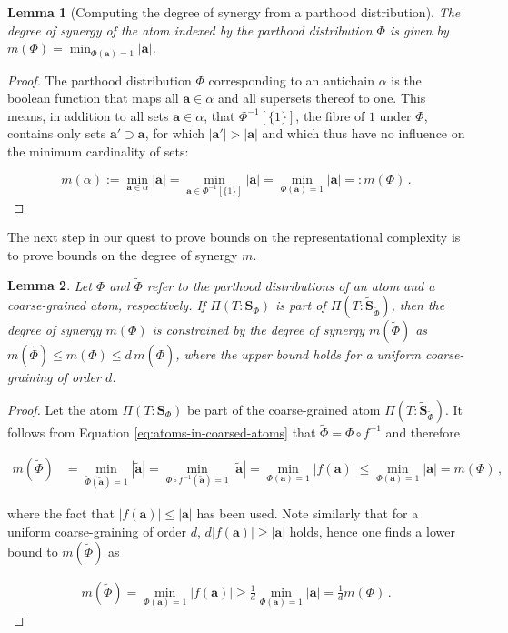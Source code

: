 \documentclass[10pt]{article}
\theoremstyle{definition}
\theoremstyle{plain}
\newtheorem{lemma}{Lemma}[section]
\begin{document}
\begin{lemma}[Computing the degree of synergy from a parthood distribution]
The degree of synergy of the atom indexed by the parthood distribution $\Phi$ is given by $m(\Phi) = \min_{\Phi(\bm{a})=1}|\bm{a}|$.
\end{lemma}
\begin{proof}
The parthood distribution $\Phi$ corresponding to an antichain $\alpha$ is the boolean function that maps all $\bm{a}\in\alpha$ and all supersets thereof to one. This means, in addition to all sets $\bm{a}\in\alpha$, that $\Phi^{-1}[\{1\}]$, the fibre of $1$ under $\Phi$, contains only sets $\bm{a}' \supset \bm{a}$, for which $|\bm{a}'| > |\bm{a}|$ and which thus have no influence on the minimum cardinality of sets:

\begin{equation}
    m(\alpha) := \min_{\bm{a}\in\alpha}|\bm{a}| = \min_{\bm{a}\in\Phi^{-1}[\{1\}]}|\bm{a}| = \min_{\Phi(\bm{a})=1}|\bm{a}| =: m(\Phi)\,.
\end{equation}
\end{proof}

The next step in our quest to prove bounds on the representational complexity is to prove bounds on the degree of synergy $m$.

\begin{lemma}
Let $\Phi$ and $\tilde{\Phi}$ refer to the parthood distributions of an atom and a coarse-grained atom, respectively. If $\Pi(T:\bm{S}_\Phi)$ is part of $\Pi(T:\bm{\tilde{S}}_{\tilde{\Phi}})$, then the degree of synergy $m(\Phi)$ is constrained by the degree of synergy $m(\tilde{\Phi})$ as $m(\tilde{\Phi}) \leq m(\Phi) \leq d\, m(\tilde{\Phi})$, where the upper bound holds for a uniform coarse-graining of order $d$.
\label{lemma:coarse_deg_syn}
\end{lemma}

\begin{proof}
Let the atom $\Pi(T:\bm{S}_\Phi)$ be part of the coarse-grained atom $\Pi(T:\bm{\tilde{S}}_{\tilde{\Phi}})$. It follows from Equation \eqref{eq:atoms-in-coarsed-atoms} that $\tilde{\Phi} = \Phi\circ f^{-1}$ and therefore

\begin{align*}
m(\tilde{\Phi}) &= \min_{\tilde{\Phi}(\bm{\tilde{a}})=1}|\bm{\tilde{a}}| = \min_{\Phi\circ f^{-1}(\bm{\tilde{a}})=1}|\bm{\tilde{a}}| = \min_{\Phi(\bm{a})=1}|f(\bm{a})| \leq \min_{\Phi(\bm{a})=1}|\bm{a}| = m(\Phi)\,,
\end{align*}

where the fact that $|f(\bm{a})|\leq|\bm{a}|$ has been used. Note similarly that for a uniform coarse-graining of order $d$, $d|f(\bm{a})|\geq|\bm{a}|$ holds, hence one finds a lower bound to $m(\tilde{\Phi})$ as

\begin{align*}
m(\tilde{\Phi}) = \min_{\Phi(\bm{a})=1}|f(\bm{a})| \geq \frac{1}{d}\min_{\Phi(\bm{a})=1}|\bm{a}| = \frac{1}{d}m(\Phi)\,.
\end{align*}

\end{proof}
\end{document}

